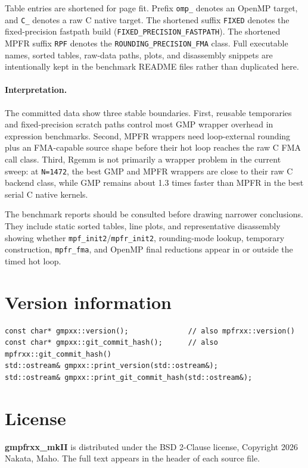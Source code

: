 \documentclass[11pt,a4paper]{article}
\newcommand{\code}[1]{\lstinline!#1!}
\begin{document}
Table entries are shortened for page fit. Prefix \code{omp_} denotes an OpenMP target, and \code{C_} denotes a raw C native target. The shortened suffix \code{FIXED} denotes the fixed-precision fastpath build
(\code{FIXED_PRECISION_FASTPATH}). The shortened MPFR suffix \code{RPF} denotes
the \code{ROUNDING_PRECISION_FMA} class. Full executable names, sorted tables,
raw-data paths, plots, and disassembly snippets are intentionally kept in the
benchmark README files rather than duplicated here.

\paragraph{Interpretation.}
The committed data show three stable boundaries. First, reusable temporaries and
fixed-precision scratch paths control most GMP wrapper overhead in expression
benchmarks. Second, MPFR wrappers need loop-external rounding plus an
FMA-capable source shape before their hot loop reaches the raw C FMA call class.
Third, Rgemm is not primarily a wrapper problem in the current sweep: at
\code{N=1472}, the best GMP and MPFR wrappers are close to their raw C backend
class, while GMP remains about 1.3 times faster than MPFR in the best serial C
native kernels.

The benchmark reports should be consulted before drawing narrower conclusions.
They include static sorted tables, line plots, and representative disassembly
showing whether \code{mpf_init2}/\code{mpfr_init2}, rounding-mode lookup,
temporary construction, \code{mpfr_fma}, and OpenMP final reductions appear in
or outside the timed hot loop.

\section{Version information}

\begin{lstlisting}
const char* gmpxx::version();              // also mpfrxx::version()
const char* gmpxx::git_commit_hash();      // also mpfrxx::git_commit_hash()
std::ostream& gmpxx::print_version(std::ostream&);
std::ostream& gmpxx::print_git_commit_hash(std::ostream&);
\end{lstlisting}

\section{License}

\textbf{gmpfrxx\_mkII} is distributed under the BSD 2-Clause license,
Copyright \textcopyright{} 2026 Nakata, Maho. The full text appears in the header
of each source file.
\end{document}
